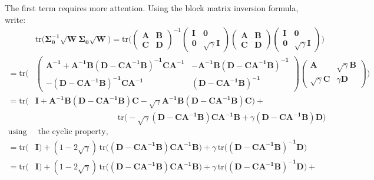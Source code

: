 \documentclass[12pt,a4paper]{article}
\begin{document}
The first term requires more attention. Using the block matrix inversion formula, write:
\begin{align*}
&\text{tr}\big(\boldsymbol{\boldsymbol{\Sigma_0^{-1} \sqrt{W} \Sigma_0} \sqrt{W}}\big) = \text{tr}\bigg(\begin{pmatrix} \boldsymbol{A} & \boldsymbol{B} \\
\boldsymbol{C} & \boldsymbol{D} \end{pmatrix}^{-1} \begin{pmatrix} \boldsymbol{I} & \boldsymbol{0} \\
\boldsymbol{0} & \sqrt{\gamma}\boldsymbol{I} \end{pmatrix} \begin{pmatrix} \boldsymbol{A} & \boldsymbol{B} \\
\boldsymbol{C} & \boldsymbol{D} \end{pmatrix} \begin{pmatrix} \boldsymbol{I} & \boldsymbol{0} \\
\boldsymbol{0} & \sqrt{\gamma}\boldsymbol{I} \end{pmatrix} \bigg)\\
= \text{tr}\Bigg(&\begin{pmatrix} \boldsymbol{A^{-1} + A^{-1}B(D-CA^{-1}B)^{-1}CA^{-1}} & \boldsymbol{-A^{-1}B(D-CA^{-1}B)^{-1}} \\
\boldsymbol{-(D-CA^{-1}B)^{-1}CA^{-1}} & \boldsymbol{(D-CA^{-1}B)^{-1}} \end{pmatrix} \begin{pmatrix} \boldsymbol{A} & \sqrt{\gamma}\boldsymbol{ B} \\
\sqrt{\gamma}\boldsymbol{ C} & \gamma\boldsymbol{D} \end{pmatrix}\Bigg) \\
= \text{tr} \big(& \boldsymbol{I + A^{-1}B(D-CA^{-1}B)C} - \sqrt{\gamma}\boldsymbol{A^{-1}B(D-CA^{-1}B)C} \big) + \\
& \qquad \qquad \qquad \qquad \qquad \text{tr} \big( -\sqrt{\gamma}\boldsymbol{(D-CA^{-1}B)CA^{-1}B} + \gamma\boldsymbol{(D-CA^{-1}B)D} \big) \\
\text{using}& \text{ the cyclic property,} \\
= \text{tr} \big(& \boldsymbol{I} \big) + (1-2\sqrt{\gamma}) \, \text{tr} \big( \boldsymbol{(D-CA^{-1}B)CA^{-1}B} \big) + \gamma \, \text{tr} \big(\boldsymbol{(D-CA^{-1}B)^{-1}D} \big) \\
= \text{tr} \big(& \boldsymbol{I} \big) + (1-2\sqrt{\gamma}) \, \text{tr} \big( \boldsymbol{(D-CA^{-1}B)CA^{-1}B} \big) + \gamma \, \text{tr} \big(\boldsymbol{(D-CA^{-1}B)^{-1}D} \big) + \\

\end{align*}
\end{document}
